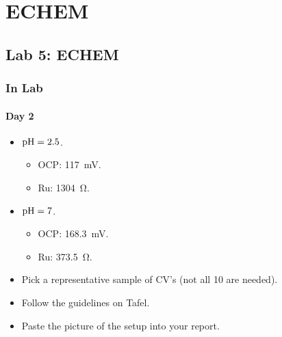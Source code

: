 \documentclass[../notes.tex]{subfiles}
\begin{document}
\chapter{ECHEM}
\section{Lab 5: ECHEM}
\subsection*{In Lab}
\subsubsection*{Day 2}
\begin{itemize}
    \item {}$\operatorname{pH}=2.5$.
    \begin{itemize}
        \item OCP: \SI{117}{\milli\volt}.
        \item Ru: \SI{1304}{\ohm}.
    \end{itemize}
    \item $\operatorname{pH}=7$.
    \begin{itemize}
        \item OCP: \SI{168.3}{\milli\volt}.
        \item Ru: \SI{373.5}{\ohm}.
    \end{itemize}
    \item Pick a representative sample of CV's (not all 10 are needed).
    \item Follow the guidelines on Tafel.
    \item Paste the picture of the setup into your report.
\end{itemize}
\end{document}
